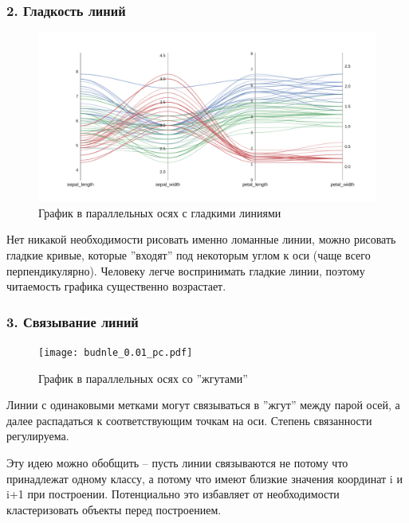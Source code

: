 \documentclass[12pt,fleqn]{article}
\begin{document}
\subsubsection{2. Гладкость линий}

\begin{figure}[htb]
    \centering
    \includegraphics[width=15cm]{smooth_pc.pdf}
    \caption{График в параллельных осях с гладкими линиями}
    \label{smooth_pc}
\end{figure}

Нет никакой необходимости рисовать именно ломанные линии, можно рисовать гладкие кривые, 
которые ''входят'' под некоторым углом к оси (чаще всего перпендикулярно).
Человеку легче воспринимать гладкие линии, поэтому
читаемость графика существенно возрастает.\cite{state_of_the_art}

\subsubsection{3. Связывание линий}

\begin{figure}[htb]
    \centering
    \texttt{[image: budnle\_0.01\_pc.pdf]}
    \caption{График в параллельных осях со ''жгутами''}
    \label{bundle0.01_pc}
\end{figure}

Линии с одинаковыми метками могут связываться в ''жгут'' между парой осей, а 
далее распадаться к соответствующим точкам на оси. Степень связанности регулируема.\cite{bundling}

Эту идею можно обобщить -- пусть линии связываются не потому что принадлежат одному классу, 
а потому что имеют близкие значения координат i и i+1 при построении. Потенциально это избавляет
от необходимости кластеризовать объекты перед построением.
\end{document}
